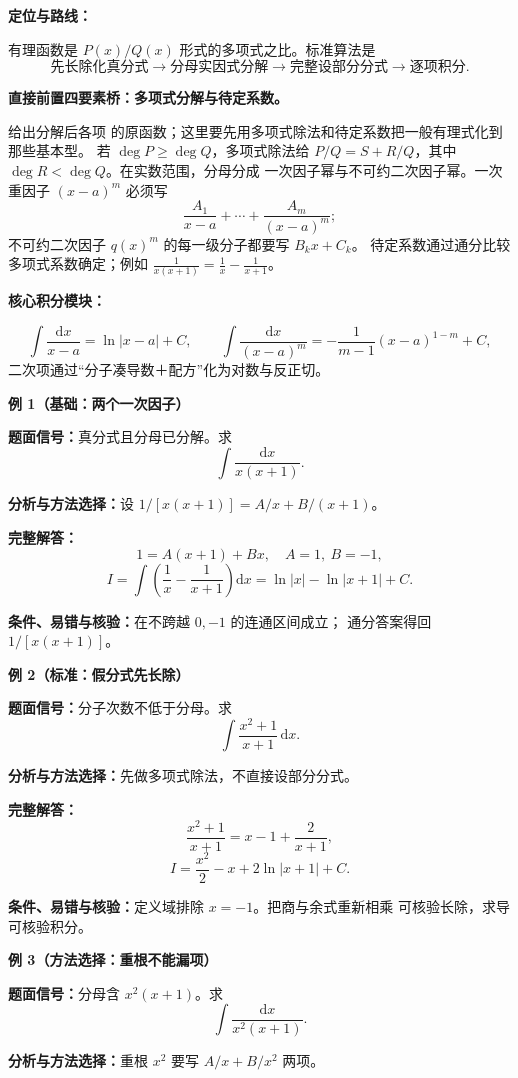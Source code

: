 \begin{knowledgeBox}
\textbf{定位与路线：}

有理函数是 \(P(x)/Q(x)\) 形式的多项式之比。标准算法是
\[
\boxed{\text{先长除化真分式}\to\text{分母实因式分解}
\to\text{完整设部分分式}\to\text{逐项积分}.}
\]

\textbf{直接前置四要素桥：多项式分解与待定系数。}

给出分解后各项
的原函数；这里要先用多项式除法和待定系数把一般有理式化到那些基本型。
若 \(\deg P\ge\deg Q\)，多项式除法给
\(P/Q=S+R/Q\)，其中 \(\deg R<\deg Q\)。在实数范围，分母分成
一次因子幂与不可约二次因子幂。一次重因子 \((x-a)^m\) 必须写
\[
\frac{A_1}{x-a}+\cdots+\frac{A_m}{(x-a)^m};
\]
不可约二次因子 \(q(x)^m\) 的每一级分子都要写 \(B_kx+C_k\)。
待定系数通过通分比较多项式系数确定；例如
\(\frac1{x(x+1)}=\frac1x-\frac1{x+1}\)。

\textbf{核心积分模块：}

\[
\int\frac{\mathrm dx}{x-a}=\ln|x-a|+C,\qquad
\int\frac{\mathrm dx}{(x-a)^m}
=-\frac1{m-1}(x-a)^{1-m}+C,
\]
二次项通过“分子凑导数＋配方”化为对数与反正切。

\textbf{例 1（基础：两个一次因子）}

\textbf{题面信号：}真分式且分母已分解。求
\[
\int\frac{\mathrm dx}{x(x+1)}.
\]

\textbf{分析与方法选择：}设 \(1/[x(x+1)]=A/x+B/(x+1)\)。

\textbf{完整解答：}
\[
1=A(x+1)+Bx,\quad A=1,\ B=-1,
\]
\[
I=\int\left(\frac1x-\frac1{x+1}\right)\mathrm dx
=\ln|x|-\ln|x+1|+C.
\]

\textbf{条件、易错与核验：}在不跨越 \(0,-1\) 的连通区间成立；
通分答案得回 \(1/[x(x+1)]\)。

\textbf{例 2（标准：假分式先长除）}

\textbf{题面信号：}分子次数不低于分母。求
\[
\int\frac{x^2+1}{x+1}\,\mathrm dx.
\]

\textbf{分析与方法选择：}先做多项式除法，不直接设部分分式。

\textbf{完整解答：}
\[
\frac{x^2+1}{x+1}=x-1+\frac2{x+1},
\]
\[
I=\frac{x^2}{2}-x+2\ln|x+1|+C.
\]

\textbf{条件、易错与核验：}定义域排除 \(x=-1\)。把商与余式重新相乘
可核验长除，求导可核验积分。

\textbf{例 3（方法选择：重根不能漏项）}

\textbf{题面信号：}分母含 \(x^2(x+1)\)。求
\[
\int\frac{\mathrm dx}{x^2(x+1)}.
\]

\textbf{分析与方法选择：}重根 \(x^2\) 要写 \(A/x+B/x^2\) 两项。


\end{knowledgeBox}
